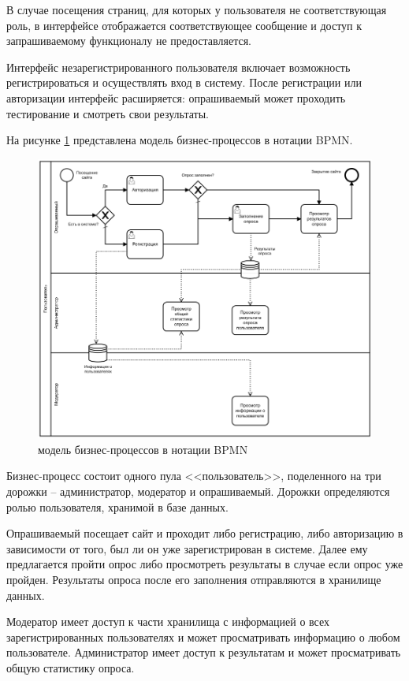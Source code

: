 В случае посещения страниц, для которых у пользователя не соответствующая роль, в интерфейсе отображается соответствующее сообщение и доступ к запрашиваемому функционалу не предоставляется.

Интерфейс незарегистрированного пользователя включает возможность регистрироваться и осуществлять вход в систему. После регистрации или авторизации интерфейс расширяется: опрашиваемый может проходить тестирование и смотреть свои результаты. 

На рисунке \ref{fig:bpmn} представлена модель бизнес-процессов в нотации BPMN.  
\begin{center}
	\begin{figure}[H]
		\centering
		\includegraphics[width=\linewidth]{assets/term-bpmn.png}
		\caption{модель бизнес-процессов в нотации BPMN}
		\label{fig:bpmn}
	\end{figure}
\end{center}
Бизнес-процесс состоит одного пула <<пользователь>>, поделенного на три дорожки -- администратор, модератор и опрашиваемый. Дорожки определяются ролью пользователя, хранимой в базе данных. 

Опрашиваемый посещает сайт и проходит либо регистрацию, либо авторизацию в зависимости от того, был ли он уже зарегистрирован в системе. Далее ему предлагается пройти опрос либо просмотреть результаты в случае если опрос уже пройден. Результаты опроса после его заполнения отправляются в хранилище данных. 

Модератор имеет доступ к части хранилища с информацией о всех зарегистрированных пользователях и может просматривать информацию о любом пользователе. Администратор имеет доступ к результатам и может просматривать общую статистику опроса.


